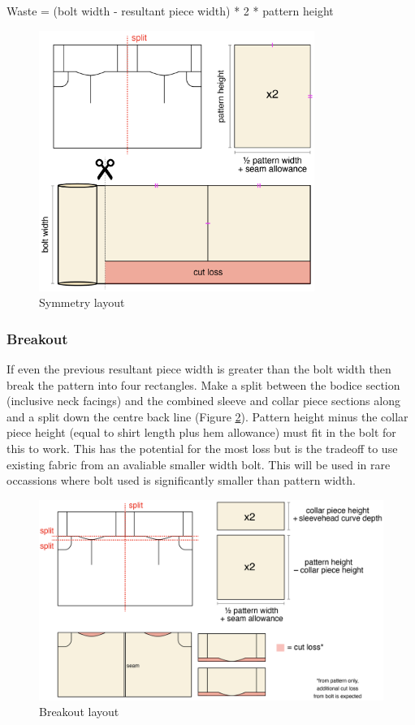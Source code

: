 Waste = (bolt width - resultant piece width) * 2 * pattern height
\begin{figure} [htb]
    \centering
    \includegraphics[width = 0.8\textwidth]{Images/symmetry layout.png}
    \caption{Symmetry layout}
    \label{fig:symmetry split}
\end{figure}

\subsubsection{Breakout}
If even the previous resultant piece width is greater than the bolt width then break the pattern into four rectangles. Make a split between the bodice section (inclusive neck facings) and the combined sleeve and collar piece sections along and a split down the centre back line (Figure \ref{fig:breakout}). Pattern height minus the collar piece height (equal to shirt length plus hem allowance) must fit in the bolt for this to work. This has the potential for the most loss but is the tradeoff to use existing fabric from an avaliable smaller width bolt. This will be used in rare occassions where bolt used is significantly smaller than pattern width.
\begin{figure} [htb]
    \centering
    \includegraphics[width = \textwidth]{Images/break out layout.png}
    \caption{Breakout layout}
    \label{fig:breakout}
\end{figure}

